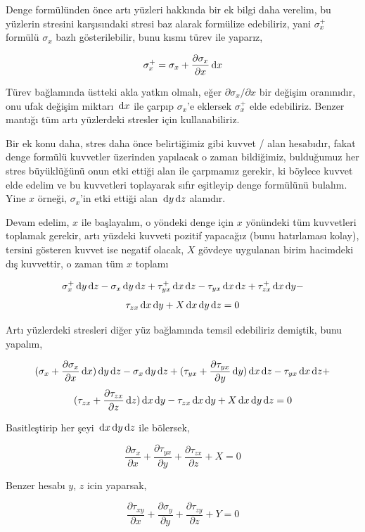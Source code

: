 \documentclass[12pt,fleqn]{article}\usepackage{../../common}
\begin{document}
Denge formülünden önce artı yüzleri hakkında bir ek bilgi daha verelim, bu
yüzlerin stresini karşısındaki stresi baz alarak formülize edebiliriz,
yani $\sigma_x^+$ formülü $\sigma_x$ bazlı gösterilebilir, bunu kısmı türev
ile yaparız, 

$$
\sigma_x^+ = \sigma_x + \frac{\partial \sigma_x}{\partial x} \,\mathrm{d} x
$$

Türev bağlamında üstteki akla yatkın olmalı, eğer $\partial \sigma_x / \partial x$
bir değişim oranınıdır, onu ufak değişim miktarı $\,\mathrm{d} x$ ile çarpıp
$\sigma_x$'e eklersek $\sigma_x^+$ elde edebiliriz. Benzer mantığı tüm artı
yüzlerdeki stresler için kullanabiliriz.

Bir ek konu daha, stres daha önce belirtiğimiz gibi kuvvet / alan hesabıdır,
fakat denge formülü kuvvetler üzerinden yapılacak o zaman bildiğimiz, bulduğumuz
her stres büyüklüğünü onun etki ettiği alan ile çarpmamız gerekir, ki böylece
kuvvet elde edelim ve bu kuvvetleri toplayarak sıfır eşitleyip denge formülünü
bulalım. Yine $x$ örneği, $\sigma_x$'in etki ettiği alan $\,\mathrm{d} y \,\mathrm{d} z$ alanıdır.

Devam edelim, $x$ ile başlayalım, o yöndeki denge için $x$ yönündeki tüm
kuvvetleri toplamak gerekir, artı yüzdeki kuvveti pozitif yapacağız (bunu
hatırlaması kolay), tersini gösteren kuvvet ise negatif olacak, $X$ gövdeye
uygulanan birim hacimdeki dış kuvvettir, o zaman tüm $x$ toplamı

$$
  \sigma_x^+ \,\mathrm{d} y \,\mathrm{d} z - \sigma_x \,\mathrm{d} y \,\mathrm{d} z +
  \tau_{yx}^+ \,\mathrm{d} x \,\mathrm{d} z - \tau_{yx} \,\mathrm{d} x \,\mathrm{d} z +
  \tau_{zx}^+ \,\mathrm{d} x \,\mathrm{d} y - 
$$
$$
  \tau_{zx} \,\mathrm{d} x \,\mathrm{d} y +   X \,\mathrm{d} x \,\mathrm{d} y \,\mathrm{d} z = 0
$$

Artı yüzlerdeki stresleri diğer yüz bağlamında temsil edebiliriz demiştik, bunu
yapalım,

$$
(\sigma_x  + \dfrac{\partial \sigma_x}{\partial x} \,\mathrm{d} x )\,\mathrm{d} y \,\mathrm{d} z - \sigma_x \,\mathrm{d} y \,\mathrm{d} z +
(\tau_{yx}  + \dfrac{\partial \tau_{yx}}{\partial y} \,\mathrm{d} y ) \,\mathrm{d} x \,\mathrm{d} z -
\tau_{yx} \,\mathrm{d} x \,\mathrm{d} z +
$$
$$
(\tau_{zx}  + \dfrac{\partial \tau_{zx}}{\partial z} \,\mathrm{d} z ) \,\mathrm{d} x \,\mathrm{d} y - \tau_{zx} \,\mathrm{d} x \,\mathrm{d} y +
X \,\mathrm{d} x \,\mathrm{d} y \,\mathrm{d} z = 0
$$

Basitleştirip her şeyi $\,\mathrm{d} x \,\mathrm{d} y \,\mathrm{d} z$ ile bölersek,

$$
\frac{\partial \sigma_x}{\partial x} + 
\frac{\partial \tau_{yx}}{\partial y} + 
\frac{\partial \tau_{zx}}{\partial z} + X = 0
$$

Benzer hesabı $y$, $z$ icin yaparsak,

$$
\frac{\partial \tau_{xy}}{\partial x} + 
\frac{\partial \sigma_y}{\partial y} + 
\frac{\partial \tau_{zy}}{\partial z} + Y = 0
$$
\end{document}
